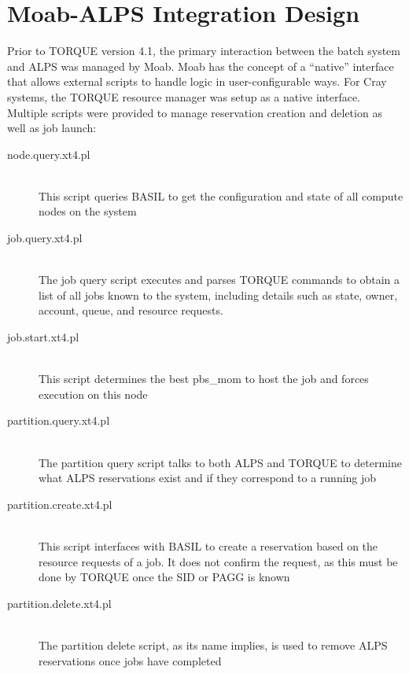 \section{Moab-ALPS Integration Design}

Prior to TORQUE version 4.1, the primary interaction between the batch system
and ALPS was managed by Moab.  Moab has the concept of a ``native'' interface
that allows external scripts to handle logic in user-configurable ways.  For
Cray systems, the TORQUE resource manager was setup as a native interface.
Multiple scripts were provided to manage reservation creation and deletion as
well as job launch:

\begin{description}
  \item[node.query.xt4.pl] \hfill \\
    This script queries BASIL to get the configuration and state of all compute nodes on the system
  \item[job.query.xt4.pl] \hfill \\
    The job query script executes and parses TORQUE commands to obtain a list of all jobs known to the system, including details such as state, owner, account, queue, and resource requests.
  \item[job.start.xt4.pl] \hfill \\
    This script determines the best pbs_mom to host the job and forces execution on this node
  \item[partition.query.xt4.pl] \hfill \\
    The partition query script talks to both ALPS and TORQUE to determine what ALPS reservations exist and if they correspond to a running job
  \item[partition.create.xt4.pl] \hfill \\
    This script interfaces with BASIL to create a reservation based on the resource requests of a job. It does not confirm the request, as this must be done by TORQUE once the SID or PAGG is known
  \item[partition.delete.xt4.pl] \hfill \\
    The partition delete script, as its name implies, is used to remove ALPS reservations once jobs have completed
\end{description}
